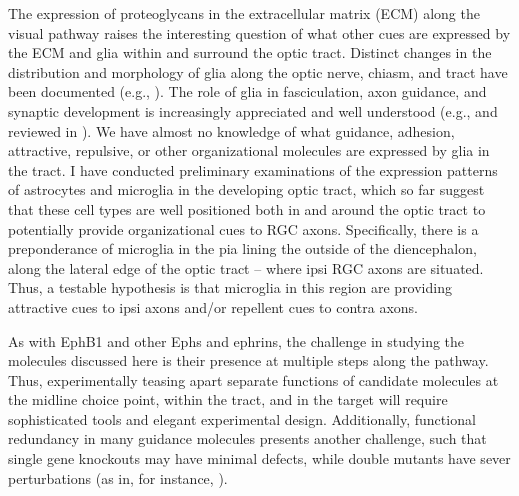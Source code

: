 The expression of proteoglycans in the extracellular matrix (ECM) along the visual pathway \cite{mcadams1995expression,ichijo2006restricted} raises the interesting question of what other cues are expressed by the ECM and glia within and surround the optic tract.
Distinct changes in the distribution and morphology of glia along the optic nerve, chiasm, and tract have been documented (e.g., ).
The role of glia in fasciculation, axon guidance, and synaptic development is increasingly appreciated and well understood (e.g.,  and reviewed in ).
We have almost no knowledge of what guidance, adhesion, attractive, repulsive, or other organizational molecules are expressed by glia in the tract.
I have conducted preliminary examinations of the expression patterns of astrocytes and microglia in the developing optic tract, which so far suggest that these cell types are well positioned both in and around the optic tract to potentially provide organizational cues to RGC axons.
Specifically, there is a preponderance of microglia in the pia lining the outside of the diencephalon, along the lateral edge of the optic tract -- where ipsi RGC axons are situated.
Thus, a testable hypothesis is that microglia in this region are providing attractive cues to ipsi axons and/or repellent cues to contra axons.

As with EphB1 and other Ephs and ephrins, the challenge in studying the molecules discussed here is their presence at multiple steps along the pathway.
Thus, experimentally teasing apart separate functions of candidate molecules at the midline choice point, within the tract, and in the target will require sophisticated tools and elegant experimental design.
Additionally, functional redundancy in many guidance molecules presents another challenge, such that single gene knockouts may have minimal defects, while double mutants have sever perturbations (as in, for instance, ).